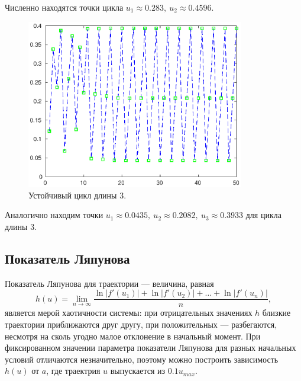 \documentclass[16pt]{article}
\begin{document}
Численно находятся точки цикла $u_1 \approx 0.283, \ u_2 \approx 0.4596$.

\begin{figure}[h]
\begin{center}
\includegraphics[width=95mm]{cycle3.eps}
\caption{Устойчивый цикл длины 3.}
\end{center}
\end{figure}


Аналогично находим точки $u_1 \approx 0.0435,\ u_2 \approx 0.2082, \ u_3 \approx 0.3933$ для цикла длины 3.

\newpage
\subsection{Показатель Ляпунова}
Показатель Ляпунова для траектории --- величина, равная
$$h(u) = \lim_{n \to \infty} \dfrac{\ln|f'(u_1)| + \ln|f'(u_2)| + \ldots + \ln|f'(u_n)|}{n},$$
является мерой хаотичности системы: при отрицательных значениях $h$ близкие траектории приближаются друг другу,
при положительных --- разбегаются, несмотря на сколь угодно малое отклонение в начальный момент. При фиксированном
значении параметра показатели Ляпунова для разных начальных условий отличаются незначительно, поэтому можно
построить зависимость $h(u)$ от $a$, где траектрия $u$ выпускается из $0.1u_{max}$.
\end{document}
